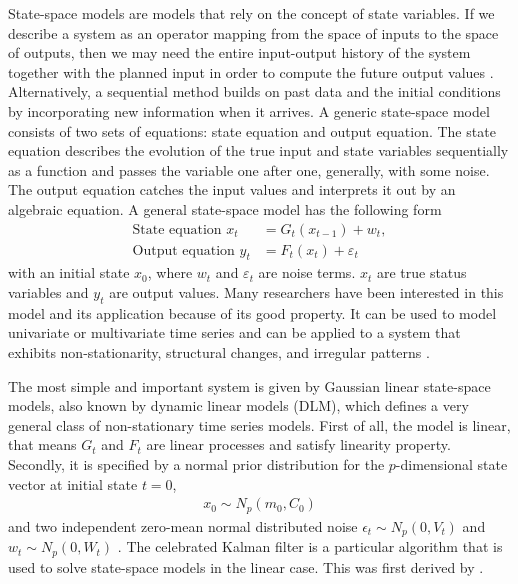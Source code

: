 State-space models are models that rely on the concept of state variables. If we describe a system as an operator mapping from the space of inputs to the space of outputs, then we may need the entire input-output history of the system together with the planned input in order to compute the future output values \citep{hangos2006analysis}. Alternatively, a sequential method builds on past data and the initial conditions by incorporating new information when it arrives. A generic state-space model consists of two sets of equations: state equation and output equation. The state equation describes the evolution of the true input and state variables sequentially as a function and passes the variable one after one, generally, with some noise. The output equation catches the input values and interprets it out by an algebraic equation. A general state-space model has the following form 
\begin{align}\label{statemodel1}
\mbox{State equation } x_t &= G_t(x_{t-1})+w_t,\\
\label{statemodel2}
\mbox{Output equation } y_t &=F_t(x_t)+\varepsilon_t
\end{align}
with an initial state $x_0$, where $w_t$ and $\varepsilon_t$ are noise terms. $x_t$ are true status variables and $y_t$ are output values. Many researchers have been interested in this model and its application because of its good property. It can be used to model univariate or multivariate time series and can be applied to a system that exhibits non-stationarity, structural changes, and irregular patterns \citep{petris2009dynamic}.

The most simple and important system is given by Gaussian linear state-space models, also known by dynamic linear models (DLM), which defines a very general class of non-stationary time series models. First of all, the model is linear, that means $G_t$ and $F_t$ are linear processes and satisfy linearity property. Secondly, it is specified by a normal prior distribution for the $p$-dimensional state vector at initial state $t=0$, 
\begin{align*}
x_0 \sim N_p(m_0,C_0)
\end{align*} 
and two independent zero-mean normal distributed noise $\epsilon_t \sim N_p(0,V_t)$ and $w_t \sim N_p(0,W_t)$ \citep{petris2009dynamic}. The celebrated Kalman filter is a particular algorithm that is used to solve state-space models in the linear case. This was first derived by \cite{kalman1960new}.

